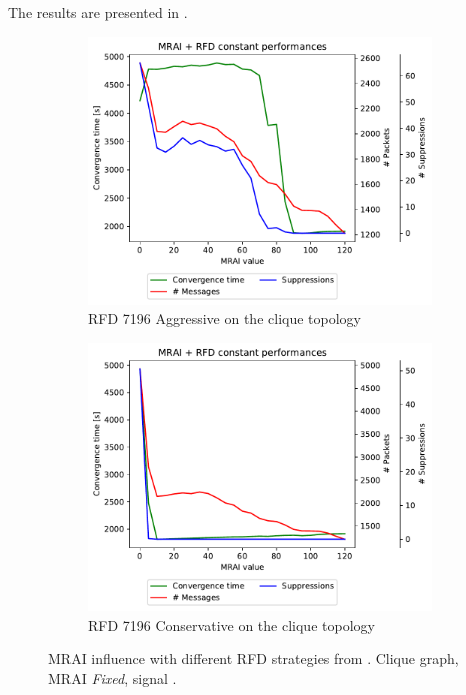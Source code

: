 The results are presented in .

\begin{figure}[h]
     \centering
     \begin{subfigure}[b]{0.49\textwidth}
         \centering
         \includegraphics[width=\textwidth]{images/RFD/clique/cisco_clique10_RFD_7196_aggressive-constant_mrai_rfd_evolution.pdf}
         \caption{RFD 7196 Aggressive on the clique topology}
         \label{fig:rfd7196aggressive}
     \end{subfigure}
     \hfill
     \begin{subfigure}[b]{0.49\textwidth}
         \centering
         \includegraphics[width=\textwidth]{images/RFD/clique/cisco_clique10_RFD_7196_conservative-constant_mrai_rfd_evolution.pdf}
         \caption{RFD 7196 Conservative on the clique topology}
         \label{fig:rfd7196conservative}
     \end{subfigure}
		\caption{MRAI influence with different RFD strategies from \cite{rfc7196}.
		Clique graph, \ac{MRAI} \textit{Fixed}, signal .}
        \label{fig:clique_rfd7196}
\end{figure}

